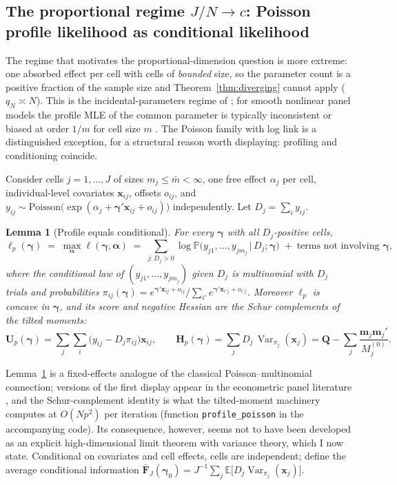 \documentclass[11pt]{article}
\newtheorem{lemma}{Lemma}
\newcommand{\E}{\mathbb{E}}
\newcommand{\Prob}{\mathbb{P}}
\newcommand{\Var}{\operatorname{Var}}
\newcommand{\bgamma}{\bm{\gamma}}
\newcommand{\balpha}{\bm{\alpha}}
\newcommand{\bx}{\mathbf{x}}
\newcommand{\bQ}{\mathbf{Q}}
\newcommand{\bH}{\mathbf{H}}
\newcommand{\bF}{\mathbf{F}}
\newcommand{\bU}{\mathbf{U}}
\begin{document}
\subsection{The proportional regime $J/N \to c$: Poisson profile
likelihood as conditional likelihood}\label{sec:proportional}

The regime that motivates the proportional-dimension question is more
extreme:
one absorbed effect per cell with cells of \emph{bounded} size, so the
parameter count is a positive fraction of the sample size and
Theorem~\ref{thm:diverging} cannot apply ($q_N \asymp N$).  This is the
incidental-parameters regime of \citet{neyman1948}; for smooth nonlinear
panel models the profile MLE of the common parameter is typically
inconsistent or biased at order $1/m$ for cell size $m$
\citep{lancaster2000,fernandezval2016}.  The Poisson family with log
link is a distinguished exception, for a structural reason worth
displaying: profiling and conditioning coincide.

Consider cells $j = 1, \dots, J$ of sizes $m_j \le \bar m < \infty$, one
free effect $\alpha_j$ per cell, individual-level covariates
$\bx_{ij}$, offsets $o_{ij}$, and
$y_{ij} \sim \mathrm{Poisson}\big(\exp(\alpha_j + \bgamma'\bx_{ij} +
o_{ij})\big)$ independently.  Let $D_j = \sum_i y_{ij}$.

\begin{lemma}[Profile equals conditional]\label{lem:conditional}
For every $\bgamma$ with all $D_j$-positive cells,
\[
\ell_p(\bgamma)
 \;=\; \max_{\balpha} \ell(\bgamma, \balpha)
 \;=\; \sum_{j : D_j > 0}
   \log \Prob\big( y_{j1}, \dots, y_{jm_j} \,\big|\, D_j ; \bgamma \big)
   \;+\; \text{terms not involving } \bgamma ,
\]
where the conditional law of $(y_{j1},\dots,y_{jm_j})$ given $D_j$ is
multinomial with $D_j$ trials and probabilities
$\pi_{ij}(\bgamma) = e^{\bgamma'\bx_{ij} + o_{ij}} / \sum_{i'}
e^{\bgamma'\bx_{i'j} + o_{i'j}}$.  Moreover $\ell_p$ is concave in
$\bgamma$, and its score and negative Hessian are the Schur complements
of the tilted moments:
\[
\bU_p(\bgamma) = \sum_j \sum_i \big( y_{ij} - D_j \pi_{ij} \big)
  \bx_{ij},
\qquad
\bH_p(\bgamma) = \sum_j D_j\, \Var_{\pi_j}(\bx_j)
 = \bQ - \sum_j \frac{\mathbf{m}_j \mathbf{m}_j'}{M_j^{(0)}} .
\]
\end{lemma}

Lemma~\ref{lem:conditional} is a fixed-effects analogue of the classical
Poisson--multinomial connection; versions of the first display appear in
the econometric panel literature
\citep{andersen1970,hausman1984,blundell2002,wooldridge1999}, and the
Schur-complement identity is what the tilted-moment machinery computes at
$O(Np^2)$ per iteration (function \texttt{profile\_poisson} in the
accompanying code).  Its consequence, however, seems not to have been
developed as an explicit high-dimensional limit theorem with variance
theory, which I now state.  Conditional on covariates and cell effects,
cells are independent; define the average conditional information
$\bar{\bF}_J(\bgamma_0) = J^{-1} \sum_j \E\big[ D_j
\Var_{\pi_j}(\bx_j) \big]$.
\end{document}
